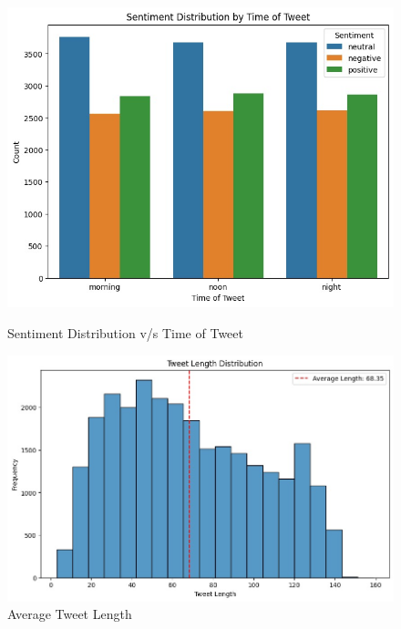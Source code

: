 \documentclass[a4paper]{article}
\theoremstyle{plain}
\theoremstyle{definition}
\begin{document}
\begin{figure}[htbp]
    \vspace{\baselineskip} %
    
    \begin{minipage}[b]{0.3\textwidth}
        \centering
        \includegraphics[width=\textwidth]{figs/3.jpg}
        \caption*{Sentiment Distribution v/s Time of Tweet}
        \label{fig:figure3}
    \end{minipage}
    \hfill
    \begin{minipage}[b]{0.3\textwidth}
        \centering
        \includegraphics[width=\textwidth]{figs/4.jpg}
        \caption*{Average Tweet Length }
        \label{fig:figure4}
    \end{minipage}
    \hfill
    \begin{minipage}[b]{0.3\textwidth}

\end{minipage}
\end{figure}
\end{document}
